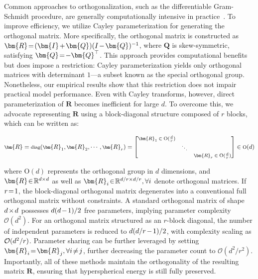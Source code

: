 Common approaches to orthogonalization, such as the differentiable Gram-Schmidt procedure, are generally computationally intensive in practice~\cite{liu2021orthogonal}. To improve efficiency, we utilize Cayley parameterization for generating the orthogonal matrix. More specifically, the orthogonal matrix is constructed as $\thickmuskip=2mu \medmuskip=2mu \bm{R} = (\bm{I} + \bm{Q})(I - \bm{Q})^{-1}$, where $\bm{Q}$ is skew-symmetric, satisfying $\thickmuskip=2mu \medmuskip=2mu \bm{Q} = -\bm{Q}^\top$. This approach provides computational benefits but does impose a restriction: Cayley parameterization yields only orthogonal matrices with determinant $1$—a subset known as the special orthogonal group. Nonetheless, our empirical results show that this restriction does not impair practical model performance. Even with Cayley transforms, however, direct parameterization of $\bm{R}$ becomes inefficient for large $d$. To overcome this, we advocate representing $\bm{R}$ using a block-diagonal structure composed of $r$ blocks, which can be written as:

\begin{equation}
    \footnotesize
    \bm{R} = \text{diag}(\bm{R}_1, \bm{R}_2, \cdots, \bm{R}_r) = \begin{bmatrix}
    \bm{R}_1 \in \text{O}(\frac{d}{r}) &  &\\
    &\ddots & \\
    & & \bm{R}_r \in \text{O}(\frac{d}{r})
    \end{bmatrix} \in \text{O}(d)
\end{equation}

where $\text{O}(d)$ represents the orthogonal group in $d$ dimensions, and $\thickmuskip=2mu \medmuskip=2mu \bm{R} \in \mathbb{R}^{d\times d}$ as well as $\thickmuskip=2mu \medmuskip=2mu \bm{R}_i \in \mathbb{R}^{d/r \times d/r},\forall i$ denote orthogonal matrices. If $\thickmuskip=2mu \medmuskip=2mu r=1$, the block-diagonal orthogonal matrix degenerates into a conventional full orthogonal matrix without constraints. A standard orthogonal matrix of shape $\thickmuskip=2mu \medmuskip=2mu d \times d$ possesses $\thickmuskip=2mu \medmuskip=2mu d(d-1)/2$ free parameters, implying parameter complexity $\mathcal{O}(d^2)$. For an orthogonal matrix structured as an $r$-block diagonal, the number of independent parameters is reduced to $\thickmuskip=2mu \medmuskip=2mu d(d/r-1)/2$, with complexity scaling as $\thickmuskip=2mu \medmuskip=2mu \mathcal{O}(d^2/r)$. Parameter sharing can be further leveraged by setting $\thickmuskip=2mu \medmuskip=2mu \bm{R}_i = \bm{R}_j, \forall i\neq j$, further decreasing the parameter count to $\mathcal{O}(d^2/r^2)$. Importantly, all of these methods maintain the orthogonality of the resulting matrix $\bm{R}$, ensuring that hyperspherical energy is still fully preserved.

